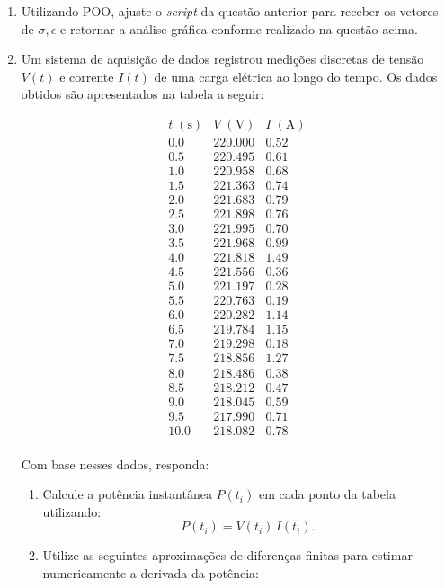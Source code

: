 \begin{enumerate}
\item Utilizando POO, ajuste o \textit{script} da questão anterior para receber os vetores de $\sigma, \epsilon$ e
retornar a análise gráfica conforme realizado na questão acima.


\item Um sistema de aquisição de dados registrou medições discretas de tensão $V(t)$ e corrente $I(t)$ de 
uma carga elétrica ao longo do tempo. Os dados obtidos são apresentados na tabela a seguir:

\[
\begin{array}{c|c|c}
t \; (\text{s}) & V \; (\text{V}) & I \; (\text{A}) \\
\hline
0.0 & 220.000 & 0.52 \\
0.5 & 220.495 & 0.61 \\
1.0 & 220.958 & 0.68 \\
1.5 & 221.363 & 0.74 \\
2.0 & 221.683 & 0.79 \\
2.5 & 221.898 & 0.76 \\
3.0 & 221.995 & 0.70 \\
3.5 & 221.968 & 0.99 \\
4.0 & 221.818 & 1.49 \\
4.5 & 221.556 & 0.36 \\
5.0 & 221.197 & 0.28 \\
5.5 & 220.763 & 0.19 \\
6.0 & 220.282 & 1.14 \\
6.5 & 219.784 & 1.15 \\
7.0 & 219.298 & 0.18 \\
7.5 & 218.856 & 1.27 \\
8.0 & 218.486 & 0.38 \\
8.5 & 218.212 & 0.47 \\
9.0 & 218.045 & 0.59 \\
9.5 & 217.990 & 0.71 \\
10.0 & 218.082 & 0.78 \\
\end{array}
\]

Com base nesses dados, responda:

\begin{enumerate}

\item Calcule a potência instantânea $P(t_i)$ em cada ponto da tabela utilizando:
\[
P(t_i) = V(t_i)\,I(t_i).
\]

\item Utilize as seguintes aproximações de diferenças finitas para estimar numericamente a derivada da potência:


\end{enumerate}
\end{enumerate}
